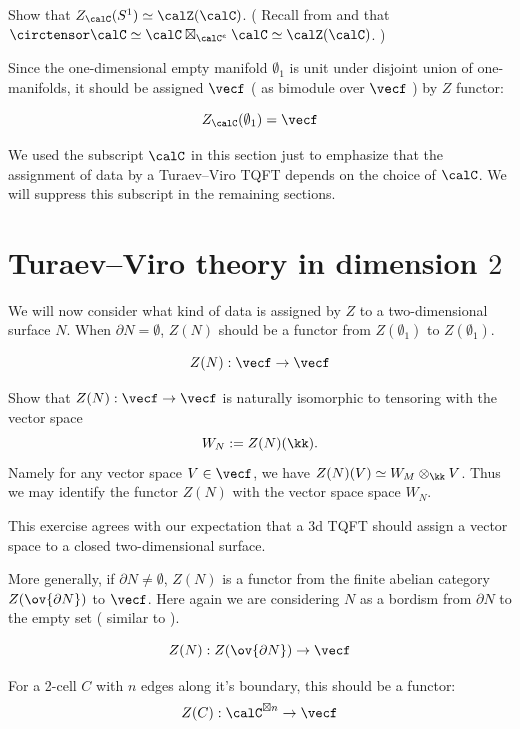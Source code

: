 \begin{exercise}
	Show that $Z_\calC ( S^1 ) \simeq \calZ(\calC)$. ( Recall from  and  
	that $ \circtensor \calC \simeq  \calC\boxtimes_{\calC^e} \calC \simeq  \calZ(\calC) $. )
\end{exercise}

Since the one-dimensional empty manifold $\emptyset_1$ is unit under disjoint union of one-manifolds, it should 
be assigned $\vecf$ ( as bimodule over $\vecf$ ) by $Z$ functor:

\[
Z_{\calC}(\emptyset_1)=\vecf
\]

We used the subscript $\calC$ in this section just to emphasize that the assignment of data by a Turaev--Viro TQFT 
depends on the choice of $\calC$. We will suppress this subscript in the remaining sections.
\section{Turaev--Viro theory in dimension $2$}\label{s:tv-dim2}

We will now consider what kind of data is assigned by $Z$ to a two-dimensional surface $N$. When
 $\partial N = \emptyset$, $Z(N)$ should be a functor from $Z(\emptyset_1)$ to $Z(\emptyset_1)$.

\[ 
Z(N): \vecf \rightarrow \vecf
\]

\begin{exercise}
	Show that $Z(N): \vecf \rightarrow \vecf$ is naturally isomorphic to tensoring with the vector space 
	$$ W_N := Z(N)(\kk).$$ Namely for any vector space $V \in \vecf$, we have $Z(N)(V) \simeq W_M \otimes_\kk V$. 
	Thus we may identify the functor $Z(N)$ with the vector space space $W_N$.
\end{exercise}

This exercise agrees with our expectation that a 3d TQFT should assign a vector space to a closed two-dimensional surface.


More generally, if $\partial N \ne \emptyset$, $Z(N)$ is a functor from the finite abelian category $Z(\ov{\partial  N})$ 
to $\vecf$. Here again we are considering $N$ as a bordism from $\partial N$ to the empty set ( similar to  ).

\[
Z(N): Z(\ov{\partial  N}) \rightarrow \vecf
\]


For a 2-cell $C$ with $n$ edges along it's boundary, this should be a functor:
\[
Z(C):\calC^{\boxtimes n}\to \vecf
\]



